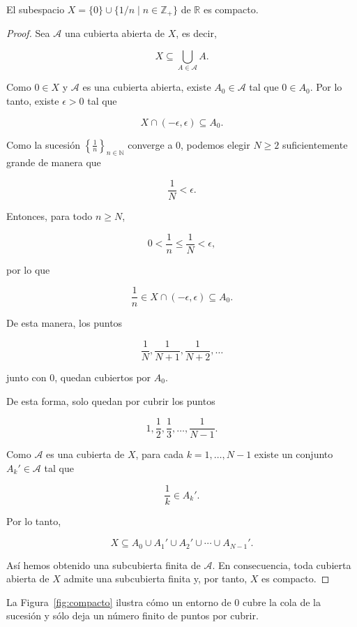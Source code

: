 \begin{example}
El subespacio $X=\{0\}\cup\{1/n\mid n\in\mathbb{Z}_{+}\}$ de $\mathbb{R}$ es compacto.
\begin{proof}
Sea \(\mathcal{A}\) una cubierta abierta de \(X\), es decir,

\[
X\subseteq \bigcup_{A\in\mathcal{A}} A.
\]

Como \(0\in X\) y \(\mathcal{A}\) es una cubierta abierta, existe \(A_0\in\mathcal{A}\) tal que \(0\in A_0\). Por lo tanto, existe \(\epsilon>0\) tal que

\[
X\cap(-\epsilon,\epsilon)\subseteq A_0.
\]

Como la sucesión \(\left\{\frac1n\right\}_{n\in\mathbb{N}}\) converge a \(0\), podemos elegir \(N\geq 2\) suficientemente grande de manera que

\[
\frac1N<\epsilon.
\]

Entonces, para todo \(n\geq N\),

\[
0<\frac1n\leq\frac1N<\epsilon,
\]

por lo que

\[
\frac1n\in X\cap(-\epsilon,\epsilon)\subseteq A_0.
\]

De esta manera, los puntos

\[
\frac1N,\frac1{N+1},\frac1{N+2},\ldots
\]

junto con \(0\), quedan cubiertos por \(A_0\).

De esta forma, solo quedan por cubrir los puntos

\[
1,\frac12,\frac13,\ldots,\frac1{N-1}.
\]

Como \(\mathcal{A}\) es una cubierta de \(X\), para cada \(k=1,\ldots,N-1\) existe un conjunto \(A_k'\in\mathcal{A}\) tal que

\[
\frac1k\in A_k'.
\]

Por lo tanto,

\[
X\subseteq A_0\cup A_1'\cup A_2'\cup\cdots\cup A_{N-1}'.
\]

Así hemos obtenido una subcubierta finita de \(\mathcal{A}\). En consecuencia, toda cubierta abierta de \(X\) admite una subcubierta finita y, por tanto, \(X\) es compacto.
\end{proof}
La Figura~\ref{fig:compacto} ilustra cómo un entorno de $0$ cubre la cola de la sucesión y sólo deja un número finito de puntos por cubrir.
\end{example}

